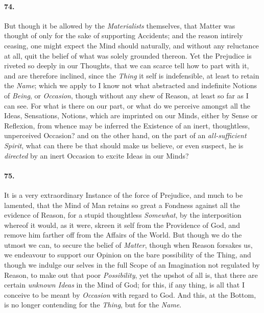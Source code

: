 \documentclass[]{article}
\newenvironment{sectionbody}{\begin{multicols}{2}}{\end{multicols}}
\begin{document}
\begin{sectionbody}
\paragraph{74.} But though it be allowed by the \emph{Materialists} themselves,
that Matter was thought of only for the sake of supporting
Accidents; and the reason intirely ceasing, one might expect the
Mind should naturally, and without any reluctance at all, quit
the belief of what was solely grounded thereon.  Yet the
Prejudice is riveted so deeply in our Thoughts, that we can
scarce tell how to part with it, and are therefore inclined,
since the \emph{Thing} it self is indefensible, at least to
retain the \emph{Name}; which we apply to I know not what
abstracted and indefinite Notions of \emph{Being}, or
\emph{Occasion}, though without any shew of Reason, at least so
far as I can see.  For what is there on our part, or what do we
perceive amongst all the Ideas, Sensations, Notions, which are
imprinted on our Minds, either by Sense or Reflexion, from whence
may be inferred the Existence of an inert, thoughtless,
unperceived Occasion? and on the other hand, on the part of an
\emph{all-sufficient Spirit}, what can there be that should
make us believe, or even suspect, he is \emph{directed} by an
inert Occasion to excite Ideas in our Minds?



\paragraph{75.} It is a very extraordinary Instance of the force of Prejudice,
and much to be lamented, that the Mind of Man retains so great a
Fondness against all the evidence of Reason, for a stupid
thoughtless \emph{Somewhat}, by the interposition whereof it
would, as it were, skreen it self from the Providence of God, and
remove him farther off from the Affairs of the World.  But though
we do the utmost we can, to secure the belief of \emph{Matter},
though when Reason forsakes us, we endeavour to support our
Opinion on the bare possibility of the Thing, and though we
indulge our selves in the full Scope of an Imagination not
regulated by Reason, to make out that poor \emph{Possibility},
yet the upshot of all is, that there are certain \emph{unknown
Ideas} in the Mind of God; for this, if any thing, is all
that I conceive to be meant by \emph{Occasion} with regard to
God.  And this, at the Bottom, is no longer contending for the
\emph{Thing}, but for the \emph{Name}.




\end{sectionbody}
\end{document}
